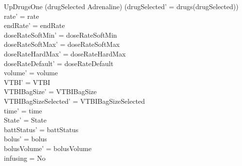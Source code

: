 \begin{schema}{UpDrugsOne}
	(drugSelected \neq Adrenaline) \land (drugSelected' = drugs(drugSelected))\\
	rate' = rate\\
	\pagebreak
	endRate' = endRate\\
	doseRateSoftMin' = doseRateSoftMin\\
	doseRateSoftMax' = doseRateSoftMax\\
	doseRateHardMax' = doseRateHardMax\\
	doseRateDefault' = doseRateDefault\\
	volume' = volume\\
	VTBI' = VTBI\\
	VTBIBagSize' = VTBIBagSize\\ VTBIBagSizeSelected' = VTBIBagSizeSelected\\
	time' = time\\ State' = State\\
	battStatus' = battStatus\\
	bolus' = bolus\\
	bolusVolume' = bolusVolume\\
	infusing = No\\

\end{schema}
